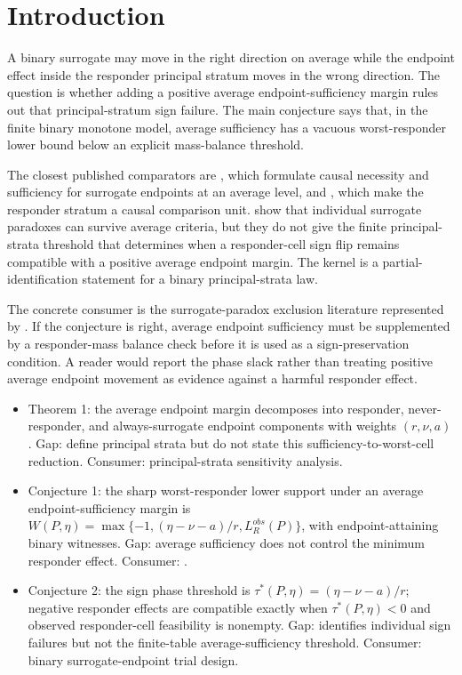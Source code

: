 \documentclass[11pt]{article}
\theoremstyle{definition}
\theoremstyle{plain}
\theoremstyle{remark}
\begin{document}
\section{Introduction}
A binary surrogate may move in the right direction on average while the endpoint effect inside the responder principal stratum moves in the wrong direction.  The question is whether adding a positive average endpoint-sufficiency margin rules out that principal-stratum sign failure.  The main conjecture says that, in the finite binary monotone model, average sufficiency has a vacuous worst-responder lower bound below an explicit mass-balance threshold.

The closest published comparators are \citet[Sec.~2]{ChenGengJia2007}, which formulate causal necessity and sufficiency for surrogate endpoints at an average level, and \citet[p.~21]{FrangakisRubin2002}, which make the responder stratum a causal comparison unit.  \citet[Sec.~2]{MaYinLiuGeng2021} show that individual surrogate paradoxes can survive average criteria, but they do not give the finite principal-strata threshold that determines when a responder-cell sign flip remains compatible with a positive average endpoint margin.  The kernel is a partial-identification statement for a binary principal-strata law.

The concrete consumer is the surrogate-paradox exclusion literature represented by \citet{YinLiuGengLuo2019}.  If the conjecture is right, average endpoint sufficiency must be supplemented by a responder-mass balance check before it is used as a sign-preservation condition.  A reader would report the phase slack rather than treating positive average endpoint movement as evidence against a harmful responder effect.

\begin{itemize}[leftmargin=*]
\item Theorem 1: the average endpoint margin decomposes into responder, never-responder, and always-surrogate endpoint components with weights \((r,\nu,a)\). Gap: \citet{FrangakisRubin2002} define principal strata but do not state this sufficiency-to-worst-cell reduction. Consumer: principal-strata sensitivity analysis.
\item Conjecture 1: the sharp worst-responder lower support under an average endpoint-sufficiency margin is \(W(P,\eta)=\max\{-1,(\eta-\nu-a)/r,L_R^{obs}(P)\}\), with endpoint-attaining binary witnesses. Gap: \citet{ChenGengJia2007} average sufficiency does not control the minimum responder effect. Consumer: \citet{YinLiuGengLuo2019}.
\item Conjecture 2: the sign phase threshold is \(\tau^*(P,\eta)=(\eta-\nu-a)/r\); negative responder effects are compatible exactly when \(\tau^*(P,\eta)<0\) and observed responder-cell feasibility is nonempty. Gap: \citet{MaYinLiuGeng2021} identifies individual sign failures but not the finite-table average-sufficiency threshold. Consumer: binary surrogate-endpoint trial design.
\end{itemize}
\end{document}
